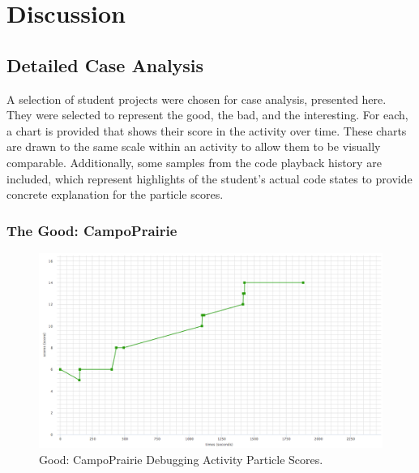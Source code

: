 \chapter{Discussion}
\label{ch:discussion}



\section{Detailed Case Analysis}
\label{sec:case_analysis}
A selection of student projects were chosen for case analysis, presented here. They were selected to represent the good, the bad, and the interesting. For each, a chart is provided that shows their score in the activity over time. These charts are drawn to the same scale within an activity to allow them to be visually comparable. Additionally, some samples from the code playback history are included, which represent highlights of the student's actual code states to provide concrete explanation for the particle scores.

\subsection{The Good: CampoPrairie}
\begin{figure}
	\centering
	\includegraphics[width=\textwidth]{images/stories/scores-debug-CampoPrairie}
	\caption[Good: CampoPrairie Debugging Activity Particle Scores]{Good: CampoPrairie Debugging Activity Particle Scores.}
	\label{fig:CampoPrairie_chart}
\end{figure}

